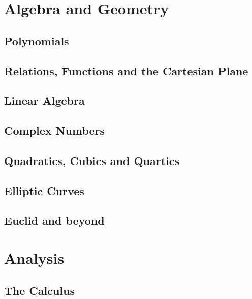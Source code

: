 \documentclass{scrbook}
\begin{document}
\part{Algebra and Geometry}

\chapter{Polynomials} %

\chapter{Relations, Functions and the Cartesian Plane} %

\chapter{Linear Algebra} %

\chapter{Complex Numbers} %

\chapter{Quadratics, Cubics and Quartics} %

\chapter{Elliptic Curves} %

\chapter{Euclid and beyond} %

\part{Analysis}

\chapter{The Calculus} %
\end{document}
